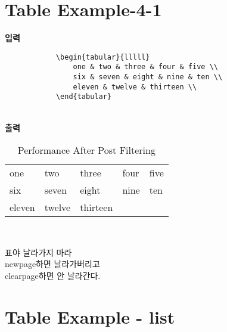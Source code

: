 \clearpage
\section{Table Example-4-1}

	\singlespacing
	\textbf{입력}\\
		\begin{boxedminipage}[t]{1.0\linewidth}
		\small
		\begin{verbatim}	
			\begin{tabular}{lllll}
				one & two & three & four & five \\
				six & seven & eight & nine & ten \\
				eleven & twelve & thirteen \\
			\end{tabular} 
		\end{verbatim} 
		\end{boxedminipage} \\

		\textbf{출력}\\
		
		\vspace{-2.0em}
		\begin{table}[h]
			\centering 
			\caption{Performance After Post Filtering}
			\begin{tabular}{l l l l l}
				\hline
				one & two & three & four & five \\
				six & seven & eight & nine & ten \\
				eleven & twelve & thirteen \\
				\hline
			\end{tabular} \\
		\end{table}
		
	\doublespacing
		
	표야 날라가지 마라 	\\
	newpage하면 날라가버리고\\
	clearpage하면 안 날라간다.\\
	
	
\clearpage
\section{Table Example - list }
	
